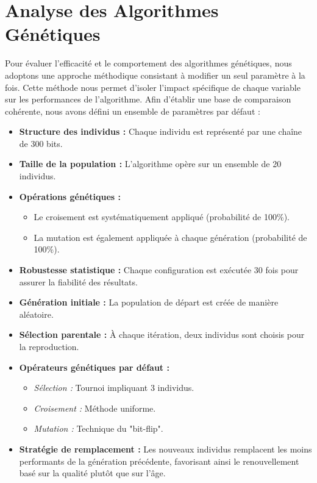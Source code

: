 \documentclass{article}
\begin{document}
\section{Analyse des Algorithmes Génétiques}

Pour évaluer l'efficacité et le comportement des algorithmes génétiques, nous adoptons une approche méthodique consistant à modifier un seul paramètre à la fois. Cette méthode nous permet d'isoler l'impact spécifique de chaque variable sur les performances de l'algorithme. Afin d'établir une base de comparaison cohérente, nous avons défini un ensemble de paramètres par défaut :

\begin{itemize}
    \item \textbf{Structure des individus :} Chaque individu est représenté par une chaîne de 300 bits.
    \item \textbf{Taille de la population :} L'algorithme opère sur un ensemble de 20 individus.
    \item \textbf{Opérations génétiques :}
    \begin{itemize}
        \item Le croisement est systématiquement appliqué (probabilité de 100\%).
        \item La mutation est également appliquée à chaque génération (probabilité de 100\%).
    \end{itemize}
    \item \textbf{Robustesse statistique :} Chaque configuration est exécutée 30 fois pour assurer la fiabilité des résultats.
    \item \textbf{Génération initiale :} La population de départ est créée de manière aléatoire.
    \item \textbf{Sélection parentale :} À chaque itération, deux individus sont choisis pour la reproduction.
    \item \textbf{Opérateurs génétiques par défaut :}
    \begin{itemize}
        \item \textit{Sélection :} Tournoi impliquant 3 individus.
        \item \textit{Croisement :} Méthode uniforme.
        \item \textit{Mutation :} Technique du "bit-flip".
    \end{itemize}
    \item \textbf{Stratégie de remplacement :} Les nouveaux individus remplacent les moins performants de la génération précédente, favorisant ainsi le renouvellement basé sur la qualité plutôt que sur l'âge.
\end{itemize}
\end{document}
